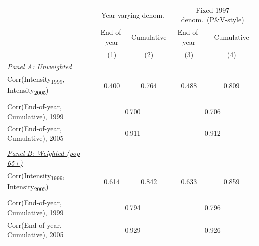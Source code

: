 \begin{tabular}{lcccc} \hline \hline
& \multicolumn{2}{c}{Year-varying denom.} & \multicolumn{2}{c}{Fixed 1997 denom.\ (P\&V-style)} \\ 
& \multicolumn{1}{c}{End-of-year} & \multicolumn{1}{c}{Cumulative} & \multicolumn{1}{c}{End-of-year} & \multicolumn{1}{c}{Cumulative} \\ 
& \multicolumn{1}{c}{(1)} & \multicolumn{1}{c}{(2)} & \multicolumn{1}{c}{(3)} & \multicolumn{1}{c}{(4)} \\ \toprule
\underline{\textit{Panel A: Unweighted}}  \\ 
Corr(Intensity{\textsubscript{1999}}, Intensity{\textsubscript{2005}}) & 0.400 & 0.764 & 0.488 & 0.809 \\ 
  & & & & \\ 
Corr(End-of-year, Cumulative), 1999 & \multicolumn{2}{c}{0.700} & \multicolumn{2}{c}{0.706} \\ 
Corr(End-of-year, Cumulative), 2005 & \multicolumn{2}{c}{0.911} & \multicolumn{2}{c}{0.912} \\ 
  & & & & \\ 
\underline{\textit{Panel B: Weighted (pop 65+)}}  \\ 
Corr(Intensity{\textsubscript{1999}}, Intensity{\textsubscript{2005}}) & 0.614 & 0.842 & 0.633 & 0.859 \\ 
  & & & & \\ 
Corr(End-of-year, Cumulative), 1999 & \multicolumn{2}{c}{0.794} & \multicolumn{2}{c}{0.796} \\ 
Corr(End-of-year, Cumulative), 2005 & \multicolumn{2}{c}{0.929} & \multicolumn{2}{c}{0.926} \\ 
\bottomrule
\end{tabular}